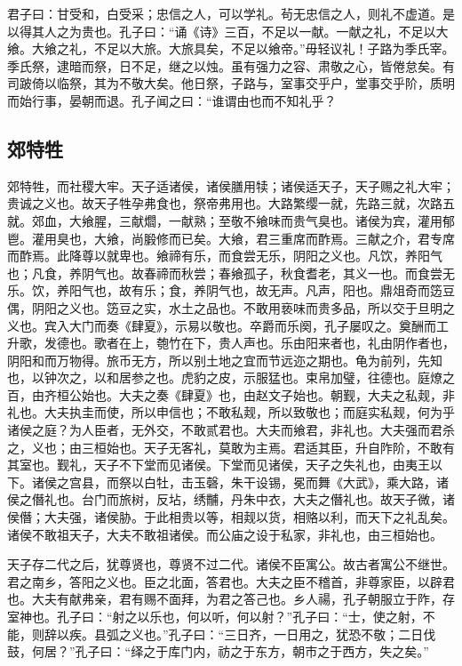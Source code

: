 \documentclass[]{article}
\begin{document}
君子曰：甘受和，白受采；忠信之人，可以学礼。茍无忠信之人，则礼不虚道。是以得其人之为贵也。孔子曰：``诵《诗》三百，不足以一献。一献之礼，不足以大飨。大飨之礼，不足以大旅。大旅具矣，不足以飨帝。''毋轻议礼！子路为季氏宰。季氏祭，逮暗而祭，日不足，继之以烛。虽有强力之容、肃敬之心，皆倦怠矣。有司跛倚以临祭，其为不敬大矣。他日祭，子路与，室事交乎户，堂事交乎阶，质明而始行事，晏朝而退。孔子闻之曰：``谁谓由也而不知礼乎？

\hypertarget{header-n419}{%
\subsection{郊特牲}\label{header-n419}}

郊特牲，而社稷大牢。天子适诸侯，诸侯膳用犊；诸侯适天子，天子赐之礼大牢；贵诚之义也。故天子牲孕弗食也，祭帝弗用也。大路繁缨一就，先路三就，次路五就。郊血，大飨腥，三献爓，一献熟；至敬不飨味而贵气臭也。诸侯为宾，灌用郁鬯。灌用臭也，大飨，尚腶修而已矣。大飨，君三重席而酢焉。三献之介，君专席而酢焉。此降尊以就卑也。飨禘有乐，而食尝无乐，阴阳之义也。凡饮，养阳气也；凡食，养阴气也。故春禘而秋尝；春飨孤子，秋食耆老，其义一也。而食尝无乐。饮，养阳气也，故有乐；食，养阴气也，故无声。凡声，阳也。鼎俎奇而笾豆偶，阴阳之义也。笾豆之实，水土之品也。不敢用亵味而贵多品，所以交于旦明之义也。宾入大门而奏《肆夏》，示易以敬也。卒爵而乐阕，孔子屡叹之。奠酬而工升歌，发德也。歌者在上，匏竹在下，贵人声也。乐由阳来者也，礼由阴作者也，阴阳和而万物得。旅币无方，所以别土地之宜而节远迩之期也。龟为前列，先知也，以钟次之，以和居参之也。虎豹之皮，示服猛也。束帛加璧，往德也。庭燎之百，由齐桓公始也。大夫之奏《肆夏》也，由赵文子始也。朝觐，大夫之私觌，非礼也。大夫执圭而使，所以申信也；不敢私觌，所以致敬也；而庭实私觌，何为乎诸侯之庭？为人臣者，无外交，不敢贰君也。大夫而飨君，非礼也。大夫强而君杀之，义也；由三桓始也。天子无客礼，莫敢为主焉。君适其臣，升自阼阶，不敢有其室也。觐礼，天子不下堂而见诸侯。下堂而见诸侯，天子之失礼也，由夷王以下。诸侯之宫县，而祭以白牡，击玉磬，朱干设锡，冕而舞《大武》，乘大路，诸侯之僭礼也。台门而旅树，反坫，绣黼，丹朱中衣，大夫之僭礼也。故天子微，诸侯僭；大夫强，诸侯胁。于此相贵以等，相觌以货，相赂以利，而天下之礼乱矣。诸侯不敢祖天子，大夫不敢祖诸侯。而公庙之设于私家，非礼也，由三桓始也。

天子存二代之后，犹尊贤也，尊贤不过二代。诸侯不臣寓公。故古者寓公不继世。君之南乡，答阳之义也。臣之北面，答君也。大夫之臣不稽首，非尊家臣，以辟君也。大夫有献弗亲，君有赐不面拜，为君之答己也。乡人禓，孔子朝服立于阼，存室神也。孔子曰：``射之以乐也，何以听，何以射？''孔子曰：``士，使之射，不能，则辞以疾。县弧之义也。''孔子曰：``三日齐，一日用之，犹恐不敬；二日伐鼓，何居？''孔子曰：``绎之于库门内，祊之于东方，朝市之于西方，失之矣。''
\end{document}

